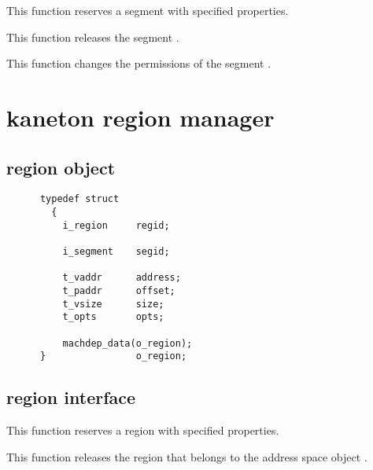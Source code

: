 	 {
	   This function reserves a segment with specified properties.
	 }

	 {
	   This function releases the segment .
	 }

	 {
	   This function changes the permissions of the segment .
	 }

\section{kaneton region manager}

\subsection*{region object}

\begin{verbatim}
      typedef struct
        {
          i_region     regid;

          i_segment    segid;

          t_vaddr      address;
          t_paddr      offset;
          t_vsize      size;
          t_opts       opts;

          machdep_data(o_region);
      }                o_region;
\end{verbatim}

\subsection*{region interface}

	 {
	   This function reserves a region with specified properties.
	 }

	 {
	   This function releases the region  that belongs
	   to the address space object .
	 }


